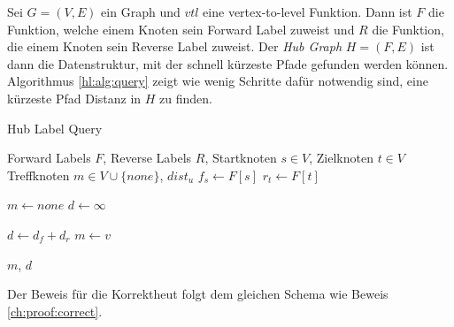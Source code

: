 Sei $G = (V, E)$ ein Graph und ${vtl}$ eine vertex-to-level Funktion.
Dann ist $F$ die Funktion, welche einem Knoten sein Forward Label zuweist und $R$ die Funktion, die einem Knoten sein Reverse Label zuweist.
Der \emph{Hub Graph} $H = (F, E)$ ist dann die Datenstruktur, mit der schnell kürzeste Pfade gefunden werden können.
Algorithmus \ref{hl:alg:query} zeigt wie wenig Schritte dafür notwendig sind, eine kürzeste Pfad Distanz in $H$ zu finden.

\begin{algorithm}[ht]
    \caption{Hub Label Query}
    \begin{algorithmic}[1]
        \Require Forward Labels $F$, Reverse Labels $R$, Startknoten $s \in V$, Zielknoten $t \in V$
        \Ensure Treffknoten $m \in V \cup \{ {none} \}$, ${dist}_u$
        \State $f_s \leftarrow F[s]$
        \State $r_t \leftarrow F[t]$

        \State
        \State $m \leftarrow {none}$
        \State $d \leftarrow \infty$

        \State $d \leftarrow d_f + d_r$
        \State $m \leftarrow v$
        \EndIf
        \EndFor

        \State
        \State \Return $m$, $d$
    \end{algorithmic}
    \label{hl:alg:query}
\end{algorithm}

Der Beweis für die Korrektheut folgt dem gleichen Schema wie Beweis \ref{ch:proof:correct}.

